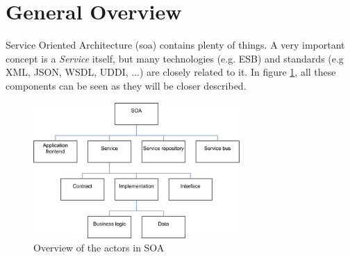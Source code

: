 \documentclass[12pt]{article}
\begin{document}
\section{General Overview}
Service Oriented Architecture (\gls{soa}) contains plenty of things. A very important concept is a \textit{Service} itself, but many technologies (e.g. ESB) and standards (e.g XML, JSON, WSDL, UDDI, ...)  are closely related to it. In figure \ref{fig:actorsSoa}, all these components can be seen as they will be closer  described.
\begin{figure}[here!]
	\centering
	\includegraphics[width=0.7\textwidth]{images/arg2}
	\caption{Overview of the actors in SOA \cite{arg2}}
	\label{fig:actorsSoa}
	\end{figure}
	\FloatBarrier
\end{document}
